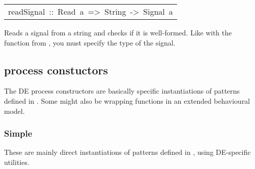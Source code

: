 \begin{haddockdesc}
\item[\begin{tabular}{@{}l}
readSignal\ ::\ Read\ a\ =>\ String\ ->\ Signal\ a
\end{tabular}]\haddockbegindoc
Reads a signal from a string and checks if it is well-formed.
 Like with the  function from , you must specify the
 type of the signal.\par
\begin{interactive}
λ> readSignal "{ 1@0, 2@2, 3@5, 4@7, 5@10 }" :: Signal Int
{ 1 @0s, 2 @2s, 3 @5s, 4 @7s, 5 @10s}
λ> readSignal "{ 1@0, 2@2, 3@5, 4@10, 5@7 }" :: Signal Int
{ 1 @0s, 2 @2s, 3 @5s*** Exception: [MoC.DE] malformed signal
λ> readSignal "{ 1@1, 2@2, 3@5, 4@7, 5@10 }" :: Signal Int
*** Exception: [MoC.DE] signal does not start from global 0
\end{interactive}
           
\end{haddockdesc}
\subsection{ process constuctors}
The DE process constructors are basically specific
 instantiations of patterns defined in . Some
 might also be wrapping functions in an extended behavioural
 model.\par

\subsubsection{Simple}
These are mainly direct instantiations of patterns defined in
 , using DE-specific utilities.\par

